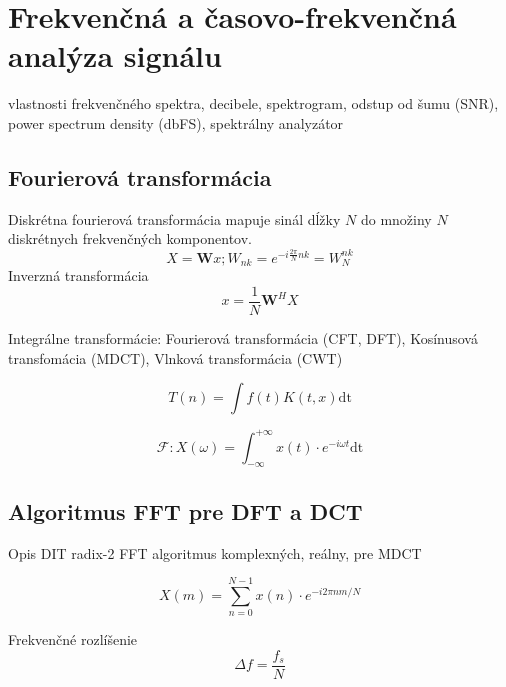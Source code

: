 \cite{survey-peaks-valleys}
\cite{peek-mountaineer-method}
\cite{ecg-r-peak-detection}
\cite{ampd-algorithm}

\section{Frekvenčná a časovo-frekvenčná analýza signálu}
vlastnosti frekvenčného spektra, decibele, spektrogram, odstup od šumu (SNR), power spectrum density (dbFS), spektrálny analyzátor 

\subsection{Fourierová transformácia}
Diskrétna fourierová transformácia mapuje sinál dĺžky $N$ do množiny $N$ diskrétnych frekvenčných komponentov. \cite{signal-processing}
\begin{equation}
X = \mathbf{W}x; W_{nk} = e^{-i\frac{2\pi}{N}nk} = W_N^{nk}
\end{equation}
Inverzná transformácia
\begin{equation}
x = \frac{1}{N}\mathbf{W}^H X
\end{equation}

Integrálne transformácie: Fourierová transformácia (CFT, DFT), Kosínusová transfomácia (MDCT), Vlnková transformácia (CWT) \cite{dct} \cite{casove-frekvencia-analyza-signalu}

\begin{equation}
T(n) = \int{f(t) K(t,x) \mathrm{dt}}
\end{equation}

\begin{equation}
\mathcal{F}: X(\omega) = \int_{-\infty}^{+\infty}{x(t) \cdot e^{-i\omega t} \mathrm{dt}}
\end{equation}

\subsection{Algoritmus FFT pre DFT a DCT}
Opis DIT radix-2 FFT algoritmus komplexných, reálny, pre MDCT \cite{fft-blackbox}

\begin{equation}
X(m) = \sum_{n = 0}^{N-1}{x(n) \cdot e^{-i2\pi n m / N}}
\end{equation}

Frekvenčné rozlíšenie
\begin{equation}
\Delta f = \frac{f_s}{N}
\end{equation}

